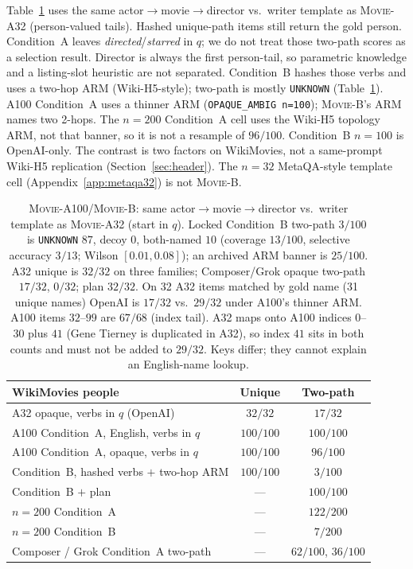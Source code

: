 \documentclass{article}
\begin{document}
Table~\ref{tab:wiki100} uses the same actor$\to$movie$\to$director vs.\
writer template as \textsc{Movie-A32} (person-valued tails).
Hashed unique-path items still return the gold person.
Condition~A leaves \emph{directed}/\emph{starred} in $q$; we do not treat
those two-path scores as a selection result.
Director is always the first person-tail, so parametric knowledge and a
listing-slot heuristic are not separated.
Condition~B hashes those verbs and uses a two-hop ARM (Wiki-H5-style);
two-path is mostly \texttt{UNKNOWN} (Table~\ref{tab:wiki100}).
A100 Condition~A uses a thinner ARM (\texttt{OPAQUE\_AMBIG n=100});
\textsc{Movie-B}'s ARM names two 2-hops.
The $n{=}200$ Condition~A cell uses the Wiki-H5 topology ARM, not that
banner, so it is not a resample of $96/100$.
Condition~B $n{=}100$ is OpenAI-only.
The contrast is two factors on WikiMovies, not a same-prompt Wiki-H5
replication (Section~\ref{sec:header}).
The $n{=}32$ MetaQA-style template cell (Appendix~\ref{app:metaqa32}) is
not \textsc{Movie-B}.

\begin{table}[ht]
\centering
\small
\setlength{\tabcolsep}{3.2pt}
\begin{tabular}{@{}lcc@{}}
\toprule
WikiMovies people & Unique & Two-path \\
\midrule
A32 opaque, verbs in $q$ (OpenAI) & $32/32$ & $17/32$ \\
A100 Condition~A, English, verbs in $q$ & $100/100$ & $100/100$ \\
A100 Condition~A, opaque, verbs in $q$ & $100/100$ & $96/100$ \\
Condition~B, hashed verbs $+$ two-hop ARM & $100/100$ & $3/100$ \\
Condition~B $+$ plan & --- & $100/100$ \\
$n{=}200$ Condition~A & --- & $122/200$ \\
$n{=}200$ Condition~B & --- & $7/200$ \\
Composer / Grok Condition~A two-path & --- & $62/100$, $36/100$ \\
\bottomrule
\end{tabular}
\caption{\textsc{Movie-A100}/\textsc{Movie-B}: same
actor$\to$movie$\to$director vs.\ writer template as \textsc{Movie-A32}
\citep{miller2016wikimovies,zhang2018metaqa} (start in $q$).
Locked Condition~B two-path $3/100$ is \texttt{UNKNOWN} $87$, decoy $0$,
both-named $10$ (coverage $13/100$, selective accuracy $3/13$;
Wilson $[0.01,0.08]$); an archived ARM banner is $25/100$.
A32 unique is $32/32$ on three families; Composer/Grok opaque two-path
$17/32$, $0/32$; plan $32/32$.
On 32 A32 items matched by gold name (31 unique names) OpenAI is $17/32$
vs.\ $29/32$ under A100's thinner ARM.
A100 items $32$--$99$ are $67/68$ (index tail).
A32 maps onto A100 indices $0$--$30$ plus $41$ (Gene Tierney is duplicated
in A32), so index $41$ sits in both counts and must not be added to
$29/32$. Keys differ; they cannot explain an English-name lookup.}
\label{tab:wiki100}
\end{table}
\FloatBarrier
\end{document}

